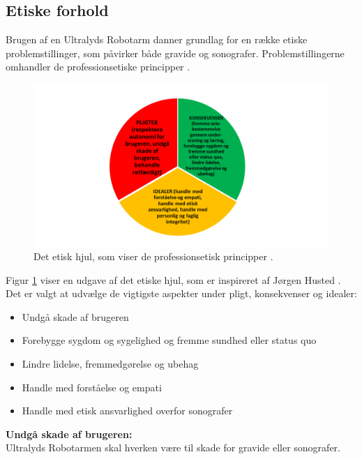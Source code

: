 \newpage
\subsection{Etiske forhold}
Brugen af en Ultralyds Robotarm danner grundlag for en række etiske problemstillinger, som påvirker både gravide og sonografer. 
Problemstillingerne omhandler de professionsetiske principper \cite{Husted}. 
\begin{figure}[H]\centering
	\includegraphics[width = 1.0\textwidth]{Figurer/Detetiskehjul}
	\caption{Det etisk hjul, som viser de professionsetisk principper \cite{Etiskehjul}.}
	\label{etiskhjul}
\end{figure}
Figur \ref{etiskhjul} viser en udgave af det etiske hjul, som er inspireret af Jørgen Husted \cite{Etiskehjul}. Det er valgt at udvælge de vigtigste aspekter under pligt, konsekvenser og idealer: 
\begin{itemize}
		\item Undgå skade af brugeren
		\item Forebygge sygdom og sygelighed og fremme sundhed eller status quo
		\item Lindre lidelse, fremmedgørelse og ubehag
		\item Handle med forståelse og empati
		\item Handle med etisk ansvarlighed overfor sonografer 
\end{itemize} 

\textbf{Undgå skade af brugeren:} \\
Ultralyds Robotarmen skal hverken være til skade for gravide eller sonografer.

